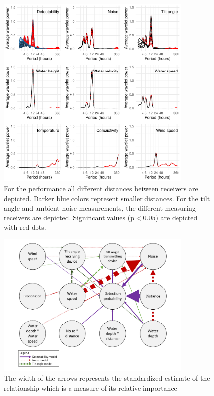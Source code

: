\documentclass[doublespacing,linenumbers]{bmcart}
\begin{document}
\begin{backmatter}
\begin{figure}[h!]
  \includegraphics[width=0.85\textwidth]{singleWaveletAverageAll}
  \caption{
      For the performance all different distances between receivers are depicted. Darker blue colors represent smaller distances. For the tilt angle and ambient noise measurements, the different measuring receivers are depicted. Significant values (p$<$0.05) are depicted with red dots.}
  \label{fig:singleWaveletAverageAll}
\end{figure}

\begin{figure}[h!]
  \includegraphics[width=0.85\textwidth]{psem5}
  \caption{
      The width of the arrows represents the standardized estimate of the relationship which is a measure of its relative importance.}
  \label{fig:psem5}
\end{figure}


\end{backmatter}
\end{document}
